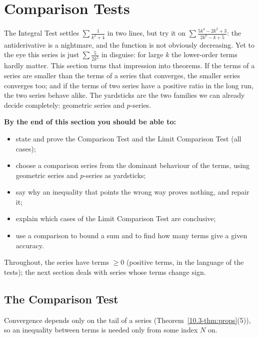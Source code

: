 \documentclass[11pt]{article}
\begin{document}
\section{Comparison Tests}

\begin{guide}
The Integral Test settles $\sum\frac1{k^2+4}$ in two lines, but try it on $\sum\frac{5k^4-2k^2+3}{2k^6-k+5}$: the antiderivative is a nightmare, and the function is not obviously decreasing. Yet to the eye this series is just $\sum\frac5{2k^2}$ in disguise: for large $k$ the lower-order terms hardly matter. This section turns that impression into theorems. If the terms of a series are smaller than the terms of a series that converges, the smaller series converges too; and if the terms of two series have a positive ratio in the long run, the two series behave alike. The yardsticks are the two families we can already decide completely: geometric series and $p$-series.
\end{guide}

\textbf{By the end of this section you should be able to:}
\begin{itemize}
  \item state and prove the Comparison Test and the Limit Comparison Test (all cases);
  \item choose a comparison series from the dominant behaviour of the terms, using geometric series and $p$-series as yardsticks;
  \item say why an inequality that points the wrong way proves nothing, and repair it;
  \item explain which cases of the Limit Comparison Test are conclusive;
  \item use a comparison to bound a sum and to find how many terms give a given accuracy.
\end{itemize}
Throughout, the series have terms $\ge0$ (positive terms, in the language of the tests); the next section deals with series whose terms change sign.

\subsection*{The Comparison Test}

Convergence depends only on the tail of a series (Theorem~\ref{10.3-thm:props}(5)), so an inequality between terms is needed only from some index $N$ on.
\end{document}
